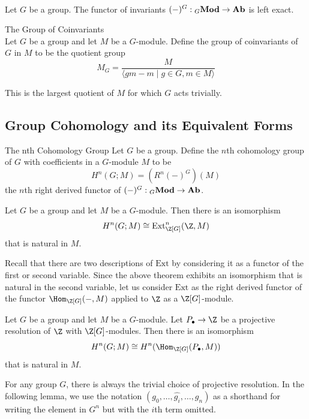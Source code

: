 \documentclass[a4paper]{article}
\begin{document}
\begin{prp}{}{}\\
Let $G$ be a group. The functor of invariants $(-)^G:{_G}\bold{Mod}\to\bold{Ab}$ is left exact. 
\end{prp}

\begin{defn}{The Group of Coinvariants}{}\\
Let $G$ be a group and let $M$ be a $G$-module. Define the group of coinvariants of $G$ in $M$ to be the quotient group $$M_G=\frac{M}{\langle gm-m\;|\;g\in G, m\in M\rangle}$$
\end{defn}

This is the largest quotient of $M$ for which $G$ acts trivially. 

\subsection{Group Cohomology and its Equivalent Forms}
\begin{defn}{The nth Cohomology Group}{} Let $G$ be a group. Define the $n$th cohomology group of $G$ with coefficients in a $G$-module $M$ to be $$H^n(G;M)=(R^n(-)^G)(M)$$ the $n$th right derived functor of $(-)^G:{_G\bold{Mod}}\to\bold{Ab}$. 
\end{defn}

\begin{thm}{}{} Let $G$ be a group and let $M$ be a $G$-module. Then there is an isomorphism $$H^n(G;M)\cong\text{Ext}^n_{\Z[G]}(\Z,M)$$ that is natural in $M$. 
\end{thm}

Recall that there are two descriptions of $\text{Ext}$ by considering it as a functor of the first or second variable. Since the above theorem exhibits an isomorphism that is natural in the second variable, let us consider $\text{Ext}$ as the right derived functor of the functor $\Hom_{\Z[G]}(-,M)$ applied to $\Z$ as a $\Z[G]$-module. 

\begin{prp}{}{} Let $G$ be a group and let $M$ be a $G$-module. Let $P_\bullet\to\Z$ be a projective resolution of $\Z$ with $\Z[G]$-modules. Then there is an isomorphism $$H^n(G;M)\cong H^n(\Hom_{\Z[G]}(P_\bullet,M))$$ that is natural in $M$. 
\end{prp}

For any group $G$, there is always the trivial choice of projective resolution. 
In the following lemma, we use the notation $(g_0,\dots,\hat{g_i},\dots,g_n)$ as a shorthand for writing the element in $G^n$ but with the $i$th term omitted. 
\end{document}

